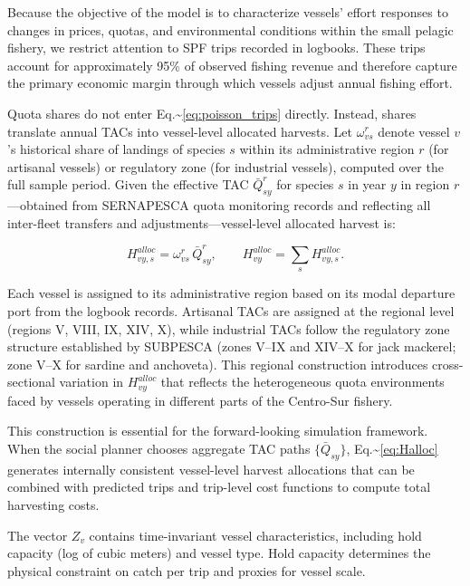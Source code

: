 \documentclass[
  11pt,
]{article}
\begin{document}
Because the objective of the model is to characterize vessels' effort responses to changes in prices, quotas, and environmental conditions within the small pelagic fishery, we restrict attention to SPF trips recorded in logbooks. These trips account for approximately 95\% of observed fishing revenue and therefore capture the primary economic margin through which vessels adjust annual fishing effort.

Quota shares do not enter Eq.\textasciitilde{}\eqref{eq:poisson_trips} directly. Instead, shares translate annual TACs into vessel-level allocated harvests. Let \(\omega_{vs}^r\) denote vessel \(v\)'s historical share of landings of species \(s\) within its administrative region \(r\) (for artisanal vessels) or regulatory zone (for industrial vessels), computed over the full sample period. Given the effective TAC \(\bar{Q}_{sy}^r\) for species \(s\) in year \(y\) in region \(r\)---obtained from SERNAPESCA quota monitoring records and reflecting all inter-fleet transfers and adjustments---vessel-level allocated harvest is:

\begin{equation}
H^{alloc}_{vy,s}=\omega_{vs}^r\,\bar{Q}_{sy}^r,
\qquad
H^{alloc}_{vy}=\sum_{s} H^{alloc}_{vy,s}.
\label{eq:Halloc}
\end{equation}

Each vessel is assigned to its administrative region based on its modal departure port from the logbook records. Artisanal TACs are assigned at the regional level (regions V, VIII, IX, XIV, X), while industrial TACs follow the regulatory zone structure established by SUBPESCA (zones V--IX and XIV--X for jack mackerel; zone V--X for sardine and anchoveta). This regional construction introduces cross-sectional variation in \(H^{alloc}_{vy}\) that reflects the heterogeneous quota environments faced by vessels operating in different parts of the Centro-Sur fishery.

This construction is essential for the forward-looking simulation framework. When the social planner chooses aggregate TAC paths \(\{\bar{Q}_{sy}\}\), Eq.\textasciitilde{}\eqref{eq:Halloc} generates internally consistent vessel-level harvest allocations that can be combined with predicted trips and trip-level cost functions to compute total harvesting costs.

The vector \(Z_v\) contains time-invariant vessel characteristics, including hold capacity (log of cubic meters) and vessel type. Hold capacity determines the physical constraint on catch per trip and proxies for vessel scale.
\end{document}
